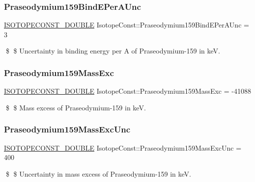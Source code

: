 \subsubsection{\texorpdfstring{Praseodymium159\+Bind\+E\+Per\+A\+Unc}{Praseodymium159BindEPerAUnc}}
{\footnotesize\ttfamily \mbox{\hyperlink{group___isotope_const-_macros_ga8f45a7272ce02c0b4c65c44636ed719a}{I\+S\+O\+T\+O\+P\+E\+C\+O\+N\+S\+T\+\_\+\+D\+O\+U\+B\+LE}} Isotope\+Const\+::\+Praseodymium159\+Bind\+E\+Per\+A\+Unc = 3}

\$ \$ Uncertainty in binding energy per A of Praseodymium-\/159 in keV. \mbox{\label{group___isotope_const-_praseodymium-_pr159_gab6b50f2a6aeeb901d64c87634cf0ae83}} 
\subsubsection{\texorpdfstring{Praseodymium159\+Mass\+Exc}{Praseodymium159MassExc}}
{\footnotesize\ttfamily \mbox{\hyperlink{group___isotope_const-_macros_ga8f45a7272ce02c0b4c65c44636ed719a}{I\+S\+O\+T\+O\+P\+E\+C\+O\+N\+S\+T\+\_\+\+D\+O\+U\+B\+LE}} Isotope\+Const\+::\+Praseodymium159\+Mass\+Exc = -\/41088}

\$ \$ Mass excess of Praseodymium-\/159 in keV. \mbox{\label{group___isotope_const-_praseodymium-_pr159_ga76a4ff2487990bb4734014688832e34f}} 
\subsubsection{\texorpdfstring{Praseodymium159\+Mass\+Exc\+Unc}{Praseodymium159MassExcUnc}}
{\footnotesize\ttfamily \mbox{\hyperlink{group___isotope_const-_macros_ga8f45a7272ce02c0b4c65c44636ed719a}{I\+S\+O\+T\+O\+P\+E\+C\+O\+N\+S\+T\+\_\+\+D\+O\+U\+B\+LE}} Isotope\+Const\+::\+Praseodymium159\+Mass\+Exc\+Unc = 400}

\$ \$ Uncertainty in mass excess of Praseodymium-\/159 in keV. \mbox{\label{group___isotope_const-_praseodymium-_pr159_gacc7d7db38815aa372866db35a803ef28}} 

